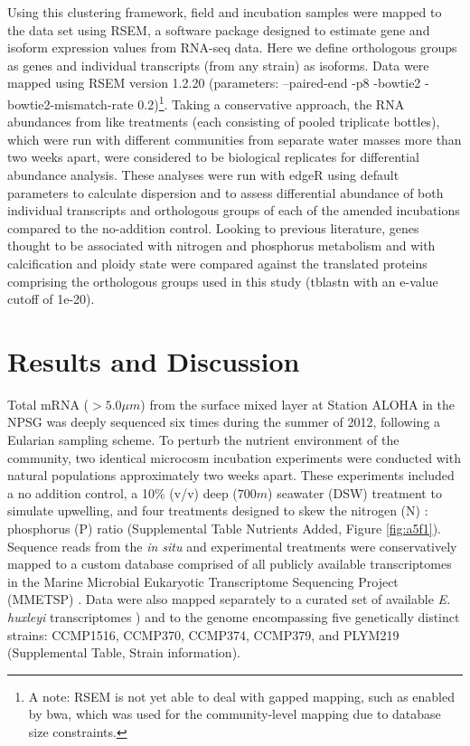 Using this clustering framework, field and incubation samples were mapped to the data set using RSEM, a software package designed to estimate gene and isoform expression values from RNA-seq data. Here we define orthologous groups as genes and individual transcripts (from any strain) as isoforms. Data were mapped using RSEM version 1.2.20 (parameters: --paired-end -p8 -bowtie2 -bowtie2-mismatch-rate 0.2)\footnote{A note: RSEM is not yet able to deal with gapped mapping, such as enabled by bwa, which was used for the community-level mapping due to database size constraints.}. Taking a conservative approach, the RNA abundances from like treatments (each consisting of pooled triplicate bottles), which were run with different communities from separate water masses more than two weeks apart, were considered to be biological replicates for differential abundance analysis. These analyses were run with edgeR using default parameters to calculate dispersion and to assess differential abundance of both individual transcripts and orthologous groups of each of the amended incubations compared to the no-addition control. Looking to previous literature, genes thought to be associated with nitrogen and phosphorus metabolism \citep{Dyhrman2006, Rokitta2014, McKew2015} and with calcification and ploidy state \citep{VonDassow2009, Mackinder2011, Frada2012} were compared against the translated proteins comprising the orthologous groups used in this study (tblastn with an e-value cutoff of 1e-20).\par



\section{Results and Discussion}

Total mRNA ($>5.0 \mu m$) from the surface mixed layer at Station ALOHA in the NPSG was deeply sequenced six times during the summer of 2012, following a Eularian sampling scheme. To perturb the nutrient environment of the community, two identical microcosm incubation experiments were conducted with natural populations approximately two weeks apart. These experiments included a no addition control, a 10\% (v/v) deep ($700m$) seawater (DSW) treatment to simulate upwelling, and four treatments designed to skew the nitrogen (N) : phosphorus (P) ratio (Supplemental Table Nutrients Added, Figure \ref{fig:a5f1}). Sequence reads from the \textit{in situ} and experimental treatments were conservatively mapped to a custom database comprised of all publicly available transcriptomes in the Marine Microbial Eukaryotic Transcriptome Sequencing Project (MMETSP) \citep{Keeling2014}. Data were also mapped separately to a curated set of available \textit{E. huxleyi} transcriptomes \citep{Keeling2014}) and to the genome \citep{Read2013} encompassing five genetically distinct strains: CCMP1516, CCMP370, CCMP374, CCMP379, and PLYM219 (Supplemental Table, Strain information).\par


